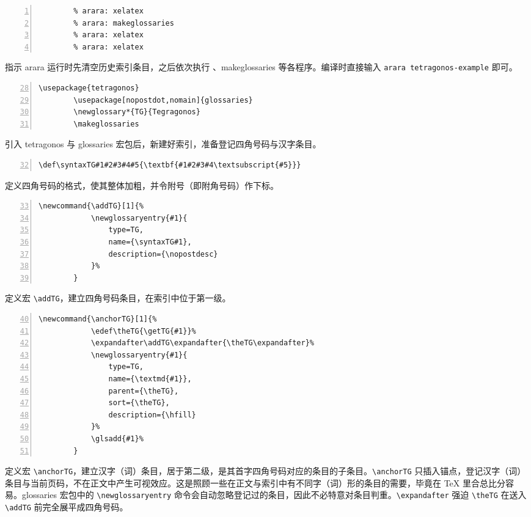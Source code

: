 \documentclass[a4paper]{ctexart}
\begin{document}
\begingroup
	\begin{adjustwidth}{3em}{3em}
	\footnotesize
	\begin{Verbatim}[numbers=left,numbersep=1ex,gobble=2,firstnumber=1,formatcom=\color{darkmiku}]
		% arara: clean: {files: [tetragonos-example.glsdefs, tetragonos-example.TG-*]}
		% arara: xelatex
		% arara: makeglossaries
		% arara: xelatex
		% arara: xelatex
	\end{Verbatim}
	指示 arara 运行时先清空历史索引条目，之后依次执行 \XeLaTeX{}、makeglossaries 等各程序。编译时直接输入 \verb|arara tetragonos-example| 即可。
	\begin{Verbatim}[numbers=left,numbersep=1ex,gobble=2,firstnumber=28,formatcom=\color{darkmiku}]
		\usepackage{tetragonos}
		\usepackage[nopostdot,nomain]{glossaries}
		\newglossary*{TG}{Tegragonos}
		\makeglossaries
	\end{Verbatim}
	引入 tetragonos 与 glossaries 宏包后，新建好索引，准备登记四角号码与汉字条目。
	\begin{Verbatim}[numbers=left,numbersep=1ex,gobble=2,firstnumber=32,formatcom=\color{darkmiku}]
		\def\syntaxTG#1#2#3#4#5{\textbf{#1#2#3#4\textsubscript{#5}}}
	\end{Verbatim}
	定义四角号码的格式，使其整体加粗，并令附号（即附角号码）作下标。
	\begin{Verbatim}[numbers=left,numbersep=1ex,gobble=2,firstnumber=33,tabsize=4,formatcom=\color{darkmiku}]
		\newcommand{\addTG}[1]{%
			\newglossaryentry{#1}{
				type=TG, 
				name={\syntaxTG#1}, 
				description={\nopostdesc}
			}%
		}
	\end{Verbatim}
	定义宏 \verb|\addTG|，建立四角号码条目，在索引中位于第一级。
	\begin{Verbatim}[numbers=left,numbersep=1ex,gobble=2,firstnumber=40,tabsize=4,formatcom=\color{darkmiku}]
		\newcommand{\anchorTG}[1]{%
			\edef\theTG{\getTG{#1}}%
			\expandafter\addTG\expandafter{\theTG\expandafter}%
			\newglossaryentry{#1}{
				type=TG, 
				name={\textmd{#1}}, 
				parent={\theTG}, 
				sort={\theTG}, 
				description={\hfill}
			}%
			\glsadd{#1}%
		}
	\end{Verbatim}
	定义宏 \verb|\anchorTG|，建立汉字（词）条目，居于第二级，是其首字四角号码对应的条目的子条目。\verb|\anchorTG| 只插入锚点，登记汉字（词）条目与当前页码，不在正文中产生可视效应。这是照顾一些在正文与索引中有不同字（词）形的条目的需要，毕竟在 \TeX{} 里合总比分容易。glossaries 宏包中的 \verb|\newglossaryentry| 命令会自动忽略登记过的条目，因此不必特意对条目判重。\verb|\expandafter| 强迫 \verb|\theTG| 在送入 \verb|\addTG| 前完全展平成四角号码。

\end{adjustwidth}
\end{document}
